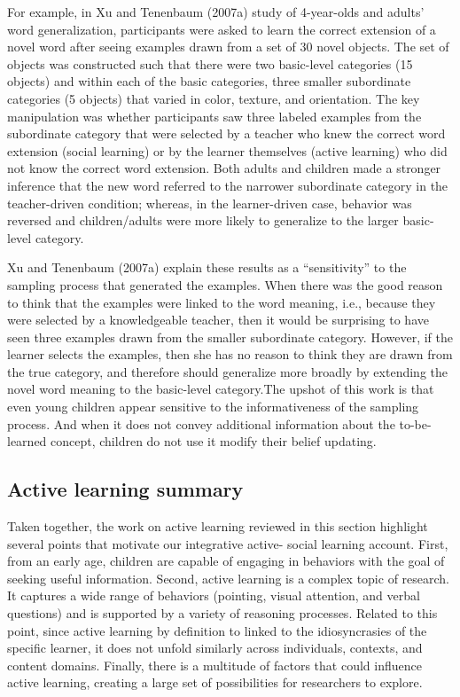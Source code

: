 \documentclass[english,floatsintext,man]{apa6}
\theoremstyle{definition}
\theoremstyle{definition}
\theoremstyle{definition}
\theoremstyle{remark}
\begin{document}
For example, in Xu and Tenenbaum (2007a) study of 4-year-olds and
adults' word generalization, participants were asked to learn the
correct extension of a novel word after seeing examples drawn from a set
of 30 novel objects. The set of objects was constructed such that there
were two basic-level categories (15 objects) and within each of the
basic categories, three smaller subordinate categories (5 objects) that
varied in color, texture, and orientation. The key manipulation was
whether participants saw three labeled examples from the subordinate
category that were selected by a teacher who knew the correct word
extension (social learning) or by the learner themselves (active
learning) who did not know the correct word extension. Both adults and
children made a stronger inference that the new word referred to the
narrower subordinate category in the teacher-driven condition; whereas,
in the learner-driven case, behavior was reversed and children/adults
were more likely to generalize to the larger basic-level category.

Xu and Tenenbaum (2007a) explain these results as a
\enquote{sensitivity} to the sampling process that generated the
examples. When there was the good reason to think that the examples were
linked to the word meaning, i.e., because they were selected by a
knowledgeable teacher, then it would be surprising to have seen three
examples drawn from the smaller subordinate category. However, if the
learner selects the examples, then she has no reason to think they are
drawn from the true category, and therefore should generalize more
broadly by extending the novel word meaning to the basic-level
category.The upshot of this work is that even young children appear
sensitive to the informativeness of the sampling process. And when it
does not convey additional information about the to-be-learned concept,
children do not use it modify their belief updating.

\subsection{Active learning summary}\label{active-learning-summary}

Taken together, the work on active learning reviewed in this section
highlight several points that motivate our integrative active- social
learning account. First, from an early age, children are capable of
engaging in behaviors with the goal of seeking useful information.
Second, active learning is a complex topic of research. It captures a
wide range of behaviors (pointing, visual attention, and verbal
questions) and is supported by a variety of reasoning processes. Related
to this point, since active learning by definition to linked to the
idiosyncrasies of the specific learner, it does not unfold similarly
across individuals, contexts, and content domains. Finally, there is a
multitude of factors that could influence active learning, creating a
large set of possibilities for researchers to explore.
\end{document}
